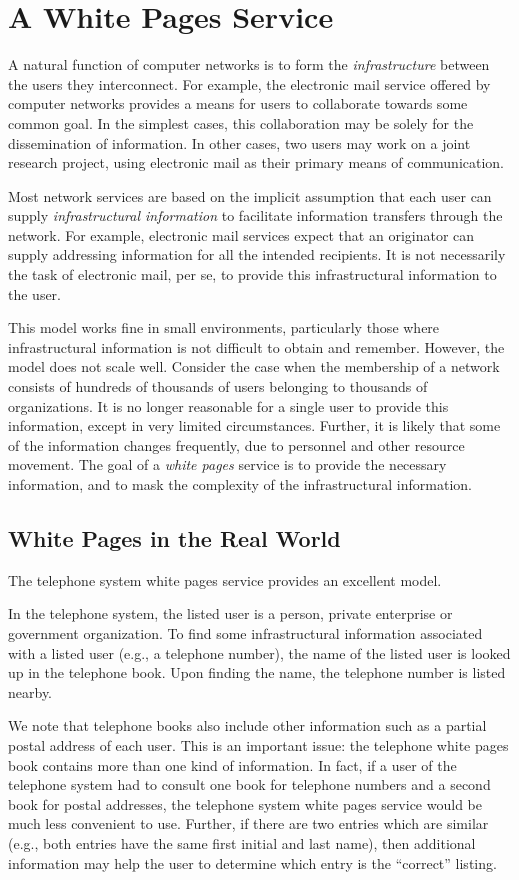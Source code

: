 \section	{A White Pages Service}
A natural function of computer networks is to form the {\em infrastructure\/}
between the users they interconnect.
For example,
the electronic mail service offered by computer networks provides a means for
users to collaborate towards some common goal.
In the simplest cases,
this collaboration may be solely for the dissemination of information.
In other cases,
two users may work on a joint research project,
using electronic mail as their primary means of communication.

Most network services are based on the implicit assumption that each user can
supply {\em infrastructural information} to 
facilitate information transfers through the network.
For example,
electronic mail services expect that an originator can supply 
addressing information 
for all the intended recipients.
It is not necessarily the task of electronic mail, per se,
to provide this infrastructural information to the user.

This model works fine in small environments,
particularly those where infrastructural information is not difficult to 
obtain and remember.
However,
the model does not scale well.
Consider the case when the membership of a network consists of hundreds of
thousands of users belonging to thousands of organizations.
It is no longer reasonable for a single user to provide this information,
except in very limited circumstances.
Further,
it is likely that some of the information changes frequently,
due to personnel and other resource movement.
The goal of a {\em white pages\/} service is to 
provide the necessary information, and to mask the complexity of the
infrastructural information.

\subsection	{White Pages in the Real World}
The telephone system
white pages service provides an excellent model.

In the telephone system,
the listed user is a person, private enterprise or government organization.
To find some infrastructural information associated with a listed user
(e.g., a telephone number),
the name of the listed user is looked up in the telephone book.
Upon finding the name,
the telephone number is listed nearby.

We note that telephone books also include other information
such as a partial postal address of each user.
This is an important issue:
the telephone white pages book contains more than one kind of information.
In fact,
if a user of the telephone system had to consult one book for telephone
numbers
and a second book for postal addresses,
the telephone system white pages service would be much less convenient to use.
Further,
if there are two entries which are similar
(e.g., both entries have the same first initial and last name),
then additional information may help the user to determine which entry is the
``correct'' listing.


